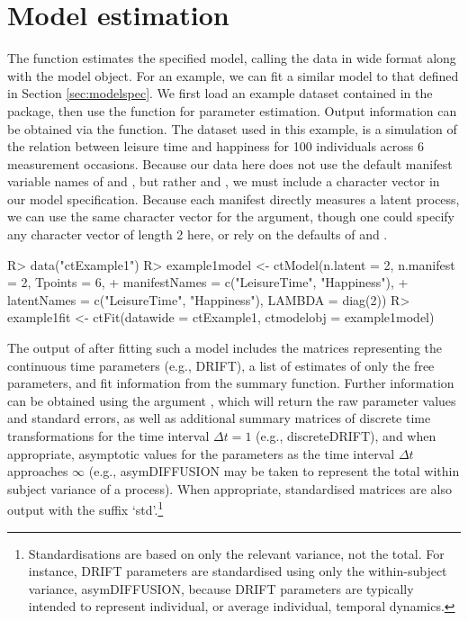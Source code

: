 \documentclass[nojss]{jss}\usepackage[]{graphicx}\usepackage[]{color}
\begin{document}
\section{Model estimation} \label{sec:modelfit}\nopagebreak
The  function estimates the specified model, calling the data in wide format along with the  model object. For an example, we can fit a similar model to that defined in Section \ref{sec:modelspec}. We first load an example dataset contained in the  package, then use the  function for parameter estimation. Output information can be obtained via the  function. The dataset used in this example, is a simulation of the relation between leisure time and happiness for 100 individuals across 6 measurement occasions.  Because our data here does not use the default manifest variable names of  and , but rather  and , we must include a  character vector in our model specification.  Because each manifest directly measures a latent process, we can use the same character vector for the  argument, though one could specify any character vector of length 2 here, or rely on the defaults of  and . 

\begin{Schunk}
\begin{Sinput}
R> data("ctExample1")
R> example1model <- ctModel(n.latent = 2, n.manifest = 2, Tpoints = 6, 
+   manifestNames = c("LeisureTime", "Happiness"), 
+   latentNames = c("LeisureTime", "Happiness"), LAMBDA = diag(2))
R> example1fit <- ctFit(datawide = ctExample1, ctmodelobj = example1model)
\end{Sinput}
\end{Schunk}

The output of  after fitting such a model includes the matrices representing the continuous time parameters (e.g., DRIFT), a list of estimates of only the free parameters, and fit information from the  summary function. Further information can be obtained using the argument , which will return the raw  parameter values and standard errors, as well as additional summary matrices of discrete time transformations for the time interval $\Delta t = 1$ (e.g., discreteDRIFT), and when appropriate, asymptotic values for the parameters as the time interval $\Delta t$ approaches $\infty $ (e.g., asymDIFFUSION may be taken to represent the total within subject variance of a process). When appropriate, standardised matrices are also output with the suffix `std'.\footnote{Standardisations are based on only the relevant variance, not the total. For instance, DRIFT parameters are standardised using only the within-subject variance, asymDIFFUSION, because DRIFT parameters are typically intended to represent individual, or average individual, temporal dynamics.}   
\end{document}
